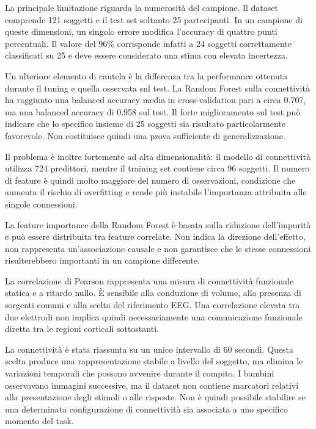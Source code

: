 La principale limitazione riguarda la numerosità del campione. Il
dataset comprende 121 soggetti e il test set soltanto 25 partecipanti.
In un campione di queste dimensioni, un singolo errore modifica
l'accuracy di quattro punti percentuali. Il valore del 96\%
corrisponde infatti a 24 soggetti correttamente classificati su 25 e
deve essere considerato una stima con elevata incertezza.

Un ulteriore elemento di cautela è la differenza tra la performance
ottenuta durante il tuning e quella osservata sul test. La Random
Forest sulla connettività ha raggiunto una balanced accuracy media
in cross-validation pari a circa 0.707, ma una balanced accuracy di
0.958 sul test. Il forte miglioramento sul test può indicare che lo
specifico insieme di 25 soggetti sia risultato particolarmente
favorevole. Non costituisce quindi una prova sufficiente di
generalizzazione.

Il problema è inoltre fortemente ad alta dimensionalità: il modello
di connettività utilizza 724 predittori, mentre il training set
contiene circa 96 soggetti. Il numero di feature è quindi molto
maggiore del numero di osservazioni, condizione che aumenta il rischio
di overfitting e rende più instabile l'importanza attribuita alle
singole connessioni.

La feature importance della Random Forest è basata sulla riduzione
dell'impurità e può essere distribuita tra feature correlate. Non
indica la direzione dell'effetto, non rappresenta un'associazione
causale e non garantisce che le stesse connessioni risulterebbero
importanti in un campione differente.

La correlazione di Pearson rappresenta una misura di connettività
funzionale statica e a ritardo nullo. È sensibile alla conduzione di
volume, alla presenza di sorgenti comuni e alla scelta del riferimento
EEG. Una correlazione elevata tra due elettrodi non implica quindi
necessariamente una comunicazione funzionale diretta tra le regioni
corticali sottostanti.

La connettività è stata riassunta su un unico intervallo di 60
secondi. Questa scelta produce una rappresentazione stabile a livello
del soggetto, ma elimina le variazioni temporali che possono avvenire
durante il compito. I bambini osservavano immagini successive, ma il
dataset non contiene marcatori relativi alla presentazione degli
stimoli o alle risposte. Non è quindi possibile stabilire se una
determinata configurazione di connettività sia associata a uno
specifico momento del task.

